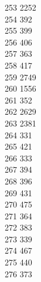 { 253	2252 \\
 254	392 \\
 255	399 \\
 256	406 \\
 257	363 \\
 258	417 \\
 259	2749 \\
 260	1556 \\
 261	352 \\
 262	2629 \\
 263	2381 \\
 264	331 \\
 265	421 \\
 266	333 \\
 267	394 \\
 268	396 \\
 269	431 \\
 270	475 \\
 271	364 \\
 272	383 \\
 273	339 \\
 274	467 \\
 275	440 \\
 276	373 \\
}
